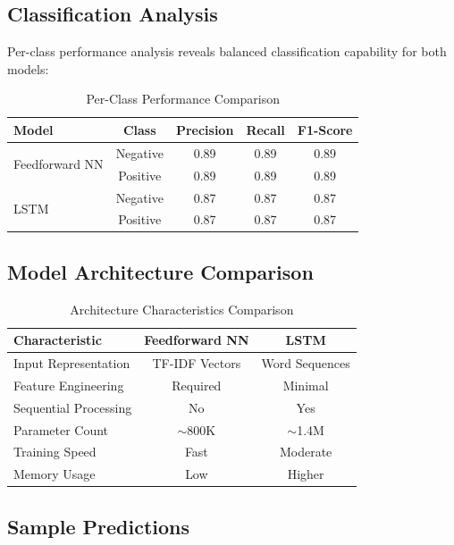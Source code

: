 \documentclass[a4paper, journal]{IEEEtran}
\begin{document}
\subsection{Classification Analysis}

Per-class performance analysis reveals balanced classification capability for both models:

\begin{table}[ht]
\centering
\caption{Per-Class Performance Comparison}
\begin{tabular}{@{}lcccc@{}}
\toprule
\textbf{Model} & \textbf{Class} & \textbf{Precision} & \textbf{Recall} & \textbf{F1-Score} \\
\midrule
\multirow{2}{*}{Feedforward NN} & Negative & 0.89 & 0.89 & 0.89 \\
                                & Positive & 0.89 & 0.89 & 0.89 \\
\midrule
\multirow{2}{*}{LSTM} & Negative & 0.87 & 0.87 & 0.87 \\
                      & Positive & 0.87 & 0.87 & 0.87 \\
\bottomrule
\end{tabular}
\label{tab:class_comparison}
\end{table}

\subsection{Model Architecture Comparison}

\begin{table}[ht]
\centering
\caption{Architecture Characteristics Comparison}

\begin{tabular}{@{}lcc@{}}
\toprule
\textbf{Characteristic} & \textbf{Feedforward NN} & \textbf{LSTM} \\
\midrule
Input Representation & TF-IDF Vectors & Word Sequences \\
Feature Engineering & Required & Minimal \\
Sequential Processing & No & Yes \\
Parameter Count & $\sim$800K & $\sim$1.4M \\
Training Speed & Fast & Moderate \\
Memory Usage & Low & Higher \\
\bottomrule
\end{tabular}
\label{tab:architecture_comparison}
\end{table}

\subsection{Sample Predictions}
\end{document}
